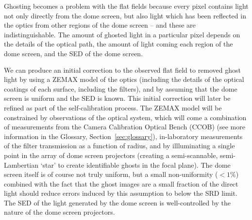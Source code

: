 \documentclass[12pt,preprint]{aastex}
\begin{document}
Ghosting becomes a problem with the flat fields because every pixel
contains light not only directly from the dome screen, but also light
which has been reflected in the optics from other regions of the dome
screen -- and these are indistinguishable.  The amount of ghosted
light in a particular pixel depends on the details of the optical
path, the amount of light coming each region of the dome screen, and
the SED of the dome screen.

We can produce an initial correction to the observed flat field to removed
ghost light by using a ZEMAX model of the optics (including the
details of the optical coatings of each surface, including the
filters), and by assuming that the dome screen is uniform and the SED
is known. This initial correction will later be refined as part of the
self-calibration process. The ZEMAX model will be constrained by observations of the
optical system, which will come a combination of measurements from the
Camera Calibration Optical Bench (CCOB) (see more information in the
Glossary, Section~\ref{sec:glossary}), in-laboratory measurements of
the filter transmission as a function of radius, and by illluminating
a single point in the array of dome screen projectors (creating a
semi-scannable, semi-Lambertian `star' to create identifiable ghosts
in the focal plane).  The dome screen itself is of course not truly
uniform, but a small non-uniformity ($<1\%$) combined with the fact
that the ghost images are a small fraction of the direct light should
reduce errors induced by this assumption to below the SRD limit. The
SED of the light generated by the dome screen is well-controlled by
the nature of the dome screen projectors.
\end{document}
